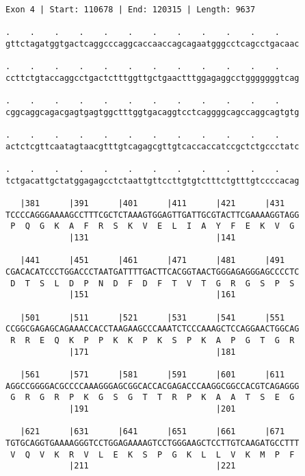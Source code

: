 \documentclass{article}
\begin{document}
\begin{Verbatim}[fontfamily=courier]
Exon 4 | Start: 110678 | End: 120315 | Length: 9637

.    .    .    .    .    .    .    .    .    .    .    .    
gttctagatggtgactcaggcccaggcaccaaccagcagaatgggcctcagcctgacaac

.    .    .    .    .    .    .    .    .    .    .    .    
ccttctgtaccaggcctgactctttggttgctgaactttggagaggcctgggggggtcag

.    .    .    .    .    .    .    .    .    .    .    .    
cggcaggcagacgagtgagtggctttggtgacaggtcctcaggggcagccaggcagtgtg

.    .    .    .    .    .    .    .    .    .    .    .    
actctcgttcaatagtaacgtttgtcagagcgttgtcaccaccatccgctctgccctatc

.    .    .    .    .    .    .    .    .    .    .    .    
tctgacattgctatggagagcctctaattgttccttgtgtctttctgtttgtccccacag

   |381      |391      |401      |411      |421      |431   
TCCCCAGGGAAAAGCCTTTCGCTCTAAAGTGGAGTTGATTGCGTACTTCGAAAAGGTAGG
 P  Q  G  K  A  F  R  S  K  V  E  L  I  A  Y  F  E  K  V  G 
             |131                          |141             

   |441      |451      |461      |471      |481      |491   
CGACACATCCCTGGACCCTAATGATTTTGACTTCACGGTAACTGGGAGAGGGAGCCCCTC
 D  T  S  L  D  P  N  D  F  D  F  T  V  T  G  R  G  S  P  S 
             |151                          |161             

   |501      |511      |521      |531      |541      |551   
CCGGCGAGAGCAGAAACCACCTAAGAAGCCCAAATCTCCCAAAGCTCCAGGAACTGGCAG
 R  R  E  Q  K  P  P  K  K  P  K  S  P  K  A  P  G  T  G  R 
             |171                          |181             

   |561      |571      |581      |591      |601      |611   
AGGCCGGGGACGCCCCAAAGGGAGCGGCACCACGAGACCCAAGGCGGCCACGTCAGAGGG
 G  R  G  R  P  K  G  S  G  T  T  R  P  K  A  A  T  S  E  G 
             |191                          |201             

   |621      |631      |641      |651      |661      |671   
TGTGCAGGTGAAAAGGGTCCTGGAGAAAAGTCCTGGGAAGCTCCTTGTCAAGATGCCTTT
 V  Q  V  K  R  V  L  E  K  S  P  G  K  L  L  V  K  M  P  F 
             |211                          |221             

\end{Verbatim}
\newpage
\end{document}
